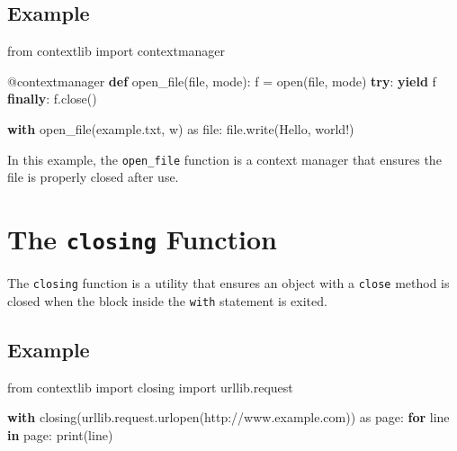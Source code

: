 \documentclass[
  letterpaper,
  DIV=11,
  numbers=noendperiod]{scrreprt}
\newenvironment{Shaded}{\begin{snugshade}}{\end{snugshade}}
\newcommand{\AttributeTok}[1]{\textcolor[rgb]{0.40,0.45,0.13}{#1}}
\newcommand{\BuiltInTok}[1]{\textcolor[rgb]{0.00,0.23,0.31}{#1}}
\newcommand{\ControlFlowTok}[1]{\textcolor[rgb]{0.00,0.23,0.31}{\textbf{#1}}}
\newcommand{\ImportTok}[1]{\textcolor[rgb]{0.00,0.46,0.62}{#1}}
\newcommand{\KeywordTok}[1]{\textcolor[rgb]{0.00,0.23,0.31}{\textbf{#1}}}
\newcommand{\NormalTok}[1]{\textcolor[rgb]{0.00,0.23,0.31}{#1}}
\newcommand{\OperatorTok}[1]{\textcolor[rgb]{0.37,0.37,0.37}{#1}}
\newcommand{\StringTok}[1]{\textcolor[rgb]{0.13,0.47,0.30}{#1}}
\begin{document}
\subsection{Example}\label{example-30}

\begin{Shaded}
\begin{Highlighting}[]
\ImportTok{from}\NormalTok{ contextlib }\ImportTok{import}\NormalTok{ contextmanager}

\AttributeTok{@contextmanager}
\KeywordTok{def}\NormalTok{ open\_file(}\BuiltInTok{file}\NormalTok{, mode):}
\NormalTok{    f }\OperatorTok{=} \BuiltInTok{open}\NormalTok{(}\BuiltInTok{file}\NormalTok{, mode)}
    \ControlFlowTok{try}\NormalTok{:}
        \ControlFlowTok{yield}\NormalTok{ f}
    \ControlFlowTok{finally}\NormalTok{:}
\NormalTok{        f.close()}

\ControlFlowTok{with}\NormalTok{ open\_file(}\StringTok{\textquotesingle{}example.txt\textquotesingle{}}\NormalTok{, }\StringTok{\textquotesingle{}w\textquotesingle{}}\NormalTok{) }\ImportTok{as} \BuiltInTok{file}\NormalTok{:}
    \BuiltInTok{file}\NormalTok{.write(}\StringTok{\textquotesingle{}Hello, world!\textquotesingle{}}\NormalTok{)}
\end{Highlighting}
\end{Shaded}

In this example, the \texttt{open\_file} function is a context manager
that ensures the file is properly closed after use.

\section{\texorpdfstring{The \texttt{closing}
Function}{The closing Function}}\label{the-closing-function}

The \texttt{closing} function is a utility that ensures an object with a
\texttt{close} method is closed when the block inside the \texttt{with}
statement is exited.

\subsection{Example}\label{example-31}

\begin{Shaded}
\begin{Highlighting}[]
\ImportTok{from}\NormalTok{ contextlib }\ImportTok{import}\NormalTok{ closing}
\ImportTok{import}\NormalTok{ urllib.request}

\ControlFlowTok{with}\NormalTok{ closing(urllib.request.urlopen(}\StringTok{\textquotesingle{}http://www.example.com\textquotesingle{}}\NormalTok{)) }\ImportTok{as}\NormalTok{ page:}
    \ControlFlowTok{for}\NormalTok{ line }\KeywordTok{in}\NormalTok{ page:}
        \BuiltInTok{print}\NormalTok{(line)}
\end{Highlighting}
\end{Shaded}
\end{document}
